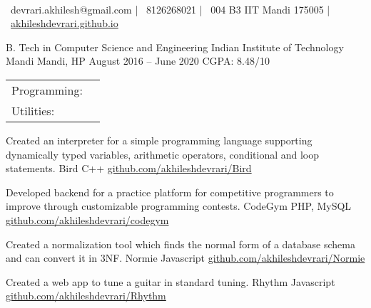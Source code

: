 \documentclass[]{awesome-cv}
\begin{document}
    
\begin{center}
	  \\
	\vspace{2mm}
	{\faEnvelope\ devrari.akhilesh@gmail.com} | {\faMobile\ 8126268021} | {\faMapMarker\ 004 B3 IIT Mandi 175005} | {\faLink\ \href{https://akhileshdevrari.github.io/}{akhileshdevrari.github.io}}
\end{center}
\begin{cventries}
	\cventry
	{B. Tech in Computer Science and Engineering}
	{Indian Institute of Technology Mandi}
	{Mandi, HP}
	{August 2016 – June 2020}
	{CGPA: 8.48/10}
\end{cventries}


\begin{cventries}
	\vspace{-4mm}
	\cventry
	{}
	{\def\arraystretch{1.15}{\begin{tabular}{ l l }
		Programming:  & {\skill{ Comfortable: C/C++, Javascript \hspace{1cm} Less experience: PHP, Python}} \\
		Utilities:  & {\skill{ MySQL, Git, Linux shell utilities}} \\
		\end{tabular}}}
	{}
	{}
	{}
\end{cventries}

\vspace{-7mm}
\begin{cventries}
	\cventry
	{Created an interpreter for a simple programming language supporting dynamically typed variables, arithmetic operators, conditional and loop statements.}
	{Bird}
	{C++}
	{\href{https://github.com/akhileshdevrari/Bird}{github.com/akhileshdevrari/Bird}}
	{}
	
	\vspace{-5mm}
	\cventry
	{Developed backend for a practice platform for competitive programmers to improve through customizable programming contests.}
	{CodeGym}
	{PHP, MySQL}
	{\href{https://github.com/akhileshdevrari/codegym}{github.com/akhileshdevrari/codegym}}
	{}
	
	
	\vspace{-5mm}
	\cventry
	{Created a normalization tool which finds the normal form of a database schema and can convert it in 3NF.}
	{Normie}
	{Javascript}
	{\href{https://github.com/akhileshdevrari/Normie}{github.com/akhileshdevrari/Normie}}
	{}
	
	\vspace{-5mm}
	\cventry
	{Created a web app to tune a guitar in standard tuning.}
	{Rhythm}
	{Javascript}
	{\href{https://github.com/akhileshdevrari/Rhythm}{github.com/akhileshdevrari/Rhythm}}
	{}
	
\end{cventries}
\end{document}
